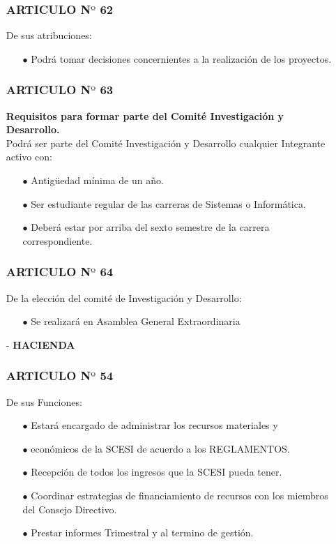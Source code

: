 \documentclass[letterpaper,11pt]{book}
\begin{document}
\begin{itemize}
\subsubsection*{ARTICULO N$º$ 62}
De sus atribuciones:
\begin{itemize}
\item[$\bullet$] Podrá tomar decisiones concernientes a la realización de los proyectos. 
\end{itemize}

\subsubsection*{ARTICULO N$º$ 63}
{\bf Requisitos para formar parte del Comité Investigación y Desarrollo.}\\
Podrá ser parte del Comité Investigación y Desarrollo cualquier Integrante activo con:
\begin{itemize}
\item[$\bullet$] Antigüedad mínima de un año. 
\item[$\bullet$] Ser estudiante regular de las carreras de Sistemas o Informática.  
\item[$\bullet$] Deberá estar por arriba del sexto semestre de la carrera correspondiente. 
\end{itemize}
\subsubsection*{ARTICULO N$º$ 64}
De la elección del comité de Investigación y Desarrollo:
\begin{itemize}
\item[$\bullet$] Se realizará en Asamblea General Extraordinaria 
\end{itemize}
\item[-] {\bf HACIENDA}
\subsubsection*{ARTICULO N$º$ 54}
De sus Funciones:
 \begin{itemize}
\item[$\bullet$] Estará encargado de administrar los recursos materiales y \item[$\bullet$] económicos de la SCESI de acuerdo a los REGLAMENTOS. 
\item[$\bullet$] Recepción de todos los ingresos que la SCESI pueda tener. 
\item[$\bullet$] Coordinar estrategias de financiamiento de recursos con los miembros del Consejo Directivo. 
\item[$\bullet$] Prestar informes Trimestral y al termino de gestión. 
\end{itemize}
 

\end{itemize}
\end{document}
